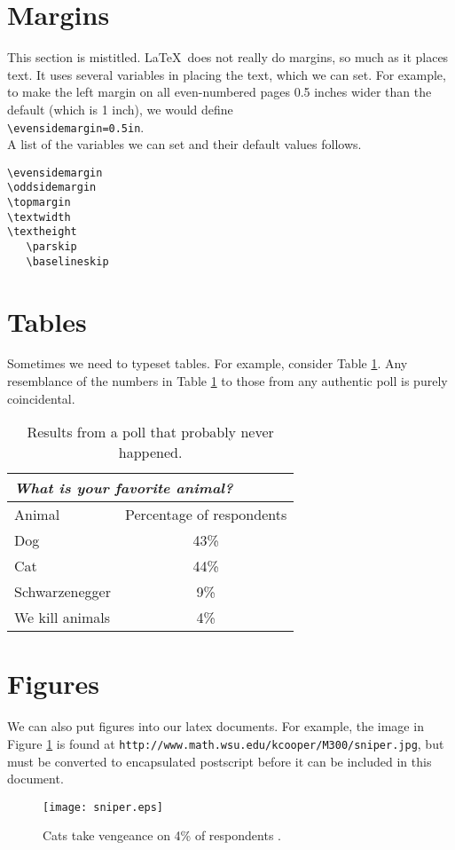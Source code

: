 \documentclass[12pt]{article}
\begin{document}
\section{Margins}
This section is mistitled.  \LaTeX\ does not really do margins,
so much as it places text.  It uses several variables in placing the
text, which we can set.  For example, to make the left margin on
all even-numbered pages 0.5 inches wider than the default (which is 
1 inch), we would define\\
\verb(\evensidemargin=0.5in(.\\
A list of the variables we can set and their default values follows.
\begin{verbatim}
\evensidemargin
\oddsidemargin
\topmargin
\textwidth
\textheight
   \parskip
   \baselineskip
   \end{verbatim}

   \section{Tables}
   Sometimes we need to typeset tables.  For example, 
   consider Table \ref{animaltable}.  
Any resemblance of the numbers in 
Table \ref{animaltable} to those from any authentic poll is purely coincidental.
\begin{table}
\begin{center}
\caption{\label{animaltable}
Results from a poll that probably never happened.}
\begin{tabular}{||l|c||}
\hline
   \cline{1-2}
   \multicolumn{2}{||l||}{{\it What is your favorite animal?}}\\
   \hline
   Animal & Percentage of respondents\\
   \hline
   Dog & 43\%\\
   Cat & 44\%\\
   Schwarzenegger & 9\%\\
   We kill animals & 4\%\\
   \hline
   \hline
   \end{tabular}
   \end{center}
   \end{table}

   \section{Figures}
   We can also put figures into our latex documents.  For example, the
   image in Figure \ref{sniper} is found at 
   {\tt http://www.math.wsu.edu/kcooper/M300/sniper.jpg}, but must
      be converted to encapsulated postscript before it can be included
      in this document.
   \begin{figure}[ht]
   \begin{center}
   \texttt{[image: sniper.eps]}
   \caption{\label{sniper}
   Cats take vengeance on 4\% of respondents \cite{calvin}.}
   \vfill
   \end{center}
\end{figure}
\end{document}
